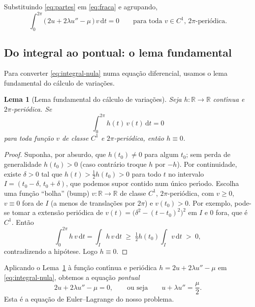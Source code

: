 \documentclass[11pt,a4paper]{amsart}
\newcommand{\R}{\mathbb{R}}
\renewcommand{\d}{\mathrm{d}}
\theoremstyle{plain}
\newtheorem{lema}[teorema]{Lema}
\theoremstyle{definition}
\theoremstyle{remark}
\begin{document}
Substituindo \eqref{eq:partes} em \eqref{eq:fraca} e agrupando,
\begin{equation}\label{eq:integral-nula}
  \int_0^{2\pi} \big(\,2u + 2\lambda u'' - \mu\,\big)\,v\,\d t = 0
  \qquad\text{para toda $v\in C^1$, $2\pi$-peri\'odica.}
\end{equation}

\subsection{Do integral ao pontual: o lema fundamental}

Para converter \eqref{eq:integral-nula} numa equa\c{c}\~ao diferencial,
usamos o lema fundamental do c\'alculo de varia\c{c}\~oes.

\begin{lema}[Lema fundamental do c\'alculo de varia\c{c}\~oes]\label{lema:fundamental}
Seja $h\colon\R\to\R$ cont\'\i nua e $2\pi$-peri\'odica. Se
\[
  \int_0^{2\pi} h(t)\,v(t)\,\d t = 0
\]
para toda fun\c{c}\~ao $v$ de classe $C^1$ e $2\pi$-peri\'odica, ent\~ao
$h\equiv 0$.
\end{lema}

\begin{proof}
Suponha, por absurdo, que $h(t_0)\neq 0$ para algum $t_0$; sem perda de
generalidade $h(t_0)>0$ (caso contr\'ario troque $h$ por $-h$). Por
continuidade, existe $\delta>0$ tal que $h(t) > \tfrac12 h(t_0) > 0$ para todo
$t$ no intervalo $I=(t_0-\delta,\,t_0+\delta)$, que podemos supor contido num
\'unico per\'\i odo. Escolha uma fun\c{c}\~ao ``bolha'' (bump)
$v\colon\R\to\R$ de classe $C^1$, $2\pi$-peri\'odica, com $v\ge 0$,
$v\equiv 0$ fora de $I$ (a menos de transla\c{c}\~oes por $2\pi$) e
$v(t_0)>0$. Por exemplo, pode-se tomar a extens\~ao peri\'odica de
$v(t)=\big(\delta^2-(t-t_0)^2\big)^2$ em $I$ e $0$ fora, que \'e $C^1$. Ent\~ao
\[
  \int_0^{2\pi} h\,v \,\d t = \int_I h\,v\,\d t
  \;\ge\; \tfrac12 h(t_0)\int_I v\,\d t \;>\; 0 ,
\]
contradizendo a hip\'otese. Logo $h\equiv 0$.
\end{proof}

Aplicando o Lema~\ref{lema:fundamental} \`a fun\c{c}\~ao cont\'\i nua e
peri\'odica $h = 2u + 2\lambda u'' - \mu$ em \eqref{eq:integral-nula}, obtemos
a equa\c{c}\~ao \emph{pontual}
\begin{equation}\label{eq:EL}
  2u + 2\lambda u'' - \mu = 0,
  \qquad\text{ou seja}\qquad
  u + \lambda u'' = \frac{\mu}{2}.
\end{equation}
Esta \'e a equa\c{c}\~ao de Euler--Lagrange do nosso problema.
\end{document}
